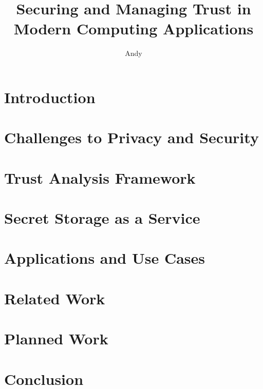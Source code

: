 \documentclass[defaultstyle,11pt]{thesis}
\title{Securing and Managing Trust in Modern Computing Applications}
\author{Andy}{Sayler}
\begin{document}


%
\chapter{Introduction}
\label{chap:intro}


\chapter{Challenges to Privacy and Security}
\label{chap:challenges}


\chapter{Trust Analysis Framework}
\label{chap:framework}


\chapter{Secret Storage as a Service}
\label{chap:ssaas}


\chapter{Applications and Use Cases}
\label{chap:apps}


\chapter{Related Work}
\label{chap:related}


\chapter{Planned Work}
\label{chap:planned}


\chapter{Conclusion}
\label{chap:conclusion}


\nocite{*}                %

\appendix
%
%
\end{document}
